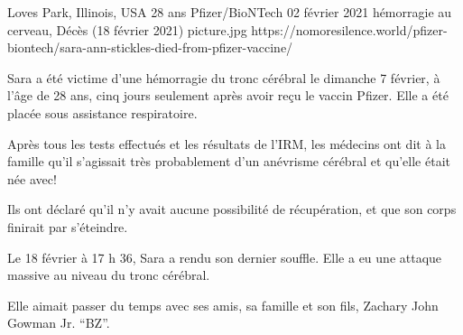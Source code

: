 {Loves Park, Illinois, USA}
{28 ans}
{Pfizer/BioNTech}
{02 février 2021}
{hémorragie au cerveau, Décès (18 février 2021)}
{picture.jpg}
{https://nomoresilence.world/pfizer-biontech/sara-ann-stickles-died-from-pfizer-vaccine/}
{

Sara a été victime d'une hémorragie du tronc cérébral le dimanche 7 février, à
l'âge de 28 ans, cinq jours seulement après avoir reçu le vaccin Pfizer. Elle a
été placée sous assistance respiratoire.

Après tous les tests effectués et les résultats de l'IRM, les médecins ont dit à
la famille qu'il s'agissait très probablement d'un anévrisme cérébral et qu'elle
était née avec!

Ils ont déclaré qu'il n'y avait aucune possibilité de récupération, et que son
corps finirait par s'éteindre.

Le 18 février à 17 h 36, Sara a rendu son dernier souffle. Elle a eu une attaque
massive au niveau du tronc cérébral.

Elle aimait passer du temps avec ses amis, sa famille et son fils, Zachary John
Gowman Jr. “BZ”.

}
